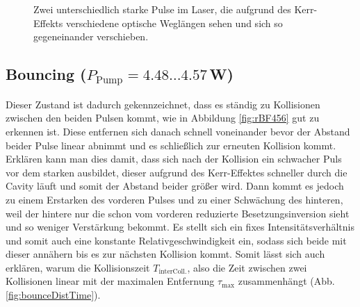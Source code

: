 \documentclass[bachelor,       %
               twoside,        %
               BCOR10mm,       %
               english,ngerman, %
               ]{GAUBM}
\begin{document}
\begin{figure}[!htb]
   \centering   
   \hfill
   \caption{Zwei unterschiedlich starke Pulse im Laser, die aufgrund des Kerr-Effekts verschiedene optische Weglängen sehen und sich so gegeneinander verschieben.}
   \label{fig:running441}
 \end{figure}

\subsection{Bouncing ($P_\text{Pump}=4.48\dots4.57\,$W)}
Dieser Zustand ist dadurch gekennzeichnet, dass es ständig zu Kollisionen zwischen den beiden Pulsen kommt, wie in Abbildung \ref{fig:rBF456} gut zu erkennen ist.
Diese entfernen sich danach schnell voneinander bevor der Abstand beider Pulse linear abnimmt und es schließlich zur erneuten Kollision kommt.
Erklären kann man dies damit, dass sich nach der Kollision ein schwacher Puls vor dem starken ausbildet, dieser aufgrund des Kerr-Effektes schneller durch die Cavity läuft und somit der Abstand beider größer wird.
Dann kommt es jedoch zu einem Erstarken des vorderen Pulses und zu einer Schwächung des hinteren, weil der hintere nur die schon vom vorderen reduzierte Besetzungsinversion sieht und so weniger Verstärkung bekommt.
Es stellt sich ein fixes Intensitätsverhältnis und somit auch eine konstante Relativgeschwindigkeit ein, sodass sich beide mit dieser annähern bis es zur nächsten Kollision kommt.
Somit lässt sich auch erklären, warum die Kollisionszeit $T_\text{interColl.}$, also die Zeit zwischen zwei Kollisionen linear mit der maximalen Entfernung $\tau_\text{max}$ zusammenhängt (Abb. \ref{fig:bounceDistTime}).
\end{document}
